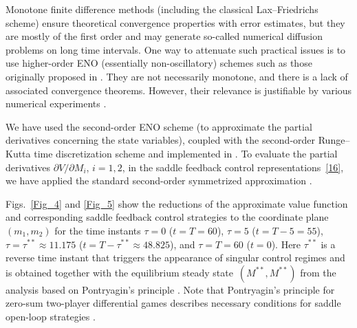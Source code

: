 \documentclass[11pt]{amsart}
\begin{document}
Monotone finite difference methods (including the classical Lax--Friedrichs scheme) ensure theoretical convergence properties with
error estimates, but they are mostly of the first order and may generate so-called numerical diffusion problems on long time intervals.
One way to attenuate such practical issues is to use higher-order ENO (essentially non-oscillatory) schemes such as those originally
proposed in \cite{OsherShu1991}. They are not necessarily monotone, and there is a lack of associated convergence theorems. However,
their relevance is justifiable by various numerical experiments \cite{OsherShu1991,BokanForcadelZidani2010}.

We have used the second-order ENO scheme (to approximate the partial derivatives concerning the state variables),
coupled with the second-order Runge--Kutta time discretization scheme and implemented in \cite{ROCHJ2019}. To evaluate
the partial derivatives $ \partial V / \partial M_i $, $ i = 1,2 $, in the saddle feedback control representations~\cref{16},
we have applied the standard second-order symmetrized approximation \cite[\S 5.7]{PressTeukolskyVetterlingFlannery2007}.

Figs.~\ref{Fig_4} and \ref{Fig_5} show the reductions of the approximate value function and corresponding saddle feedback control
strategies to the coordinate plane $ (m_1, m_2) $ for the time instants $ \tau = 0 $ ($ t = T = 60 $), $ \tau = 5 $ ($ t = T - 5 = 55 $),
$ \tau = \tau^{**} \approx 11.175 $ ($ t = T - \tau^{**} \approx 48.825 $), and $ \tau = T = 60 $ ($ t = 0 $). Here $ \tau^{**} $ is
a reverse time instant that triggers the appearance of singular control regimes and is obtained together with the equilibrium
steady state~$ \left( M^{**}, M^{**} \right) $ from the analysis based on Pontryagin's principle
\cite{YegorovGrognardMailleretHalkettBernhard2019}. Note that Pontryagin's principle for zero-sum two-player differential games describes
necessary conditions for saddle open-loop strategies \cite{Yong2015}.
\end{document}
